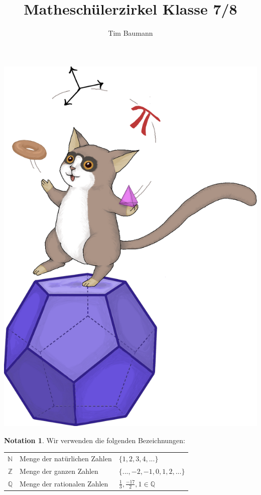 \documentclass[a4paper,ngerman,12pt]{scrartcl}
\newcommand{\N}{\mathbb{N}}
\newcommand{\Z}{\mathbb{Z}}
\newcommand{\Q}{\mathbb{Q}}
\theoremstyle{definition}
\newtheorem*{nota}{Notation}
\begin{document}
\title{Matheschülerzirkel Klasse 7/8}
\author{Tim Baumann}
\date{}
\maketitle

\begin{center}
  \includegraphics[scale=0.15]{gregor}
\end{center}

\begin{shaded}
  \begin{nota}
    Wir verwenden die folgenden Bezeichnungen:

    \begin{tabular}{ r l l }
      $\N$ & Menge der natürlichen Zahlen & $\{ 1, 2, 3, 4, ... \}$ \\
      $\Z$ & Menge der ganzen Zahlen & $\{ ..., -2, -1, 0, 1, 2, ... \}$ \\
      $\Q$ & Menge der rationalen Zahlen & $\tfrac{1}{3}, \tfrac{-17}{2}, 1 \in \Q$
    \end{tabular}
  \end{nota}
\end{shaded}
\end{document}
